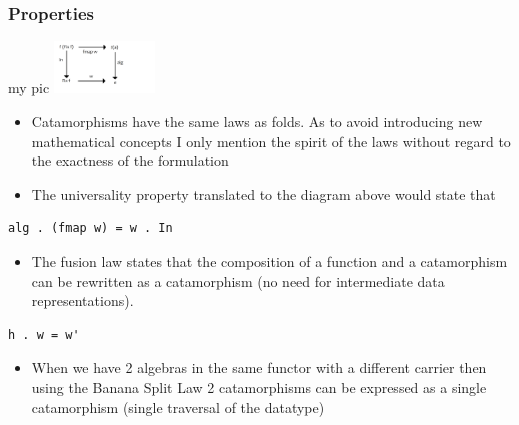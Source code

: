 \documentclass[10pt]{beamer}
\begin{document}
\begin{frame}[fragile]
\frametitle{Properties}

\begin{block}{my pic}
\includegraphics[width=0.2\textwidth]{graf3.png}	
\end{block}
\begin{itemize}
\item Catamorphisms have the same laws as folds. As to avoid introducing new mathematical concepts I only mention the 
	spirit of the laws without regard to the exactness of the formulation 
\item The universality property translated to the diagram above would state that

\end{itemize}

\begin{lstlisting}
alg . (fmap w) = w . In
\end{lstlisting}

\begin{itemize}
	\item The fusion law states that the composition of a function and a catamorphism can be rewritten as a catamorphism (no need for intermediate data representations).
\end{itemize}

\begin{lstlisting}
h . w = w'
\end{lstlisting}

\begin{itemize}
\item When we have 2 algebras in the same functor with a different carrier then using the Banana Split Law 2 catamorphisms can be expressed as a single catamorphism (single traversal of the datatype)
\end{itemize}
\end{frame}
\end{document}
